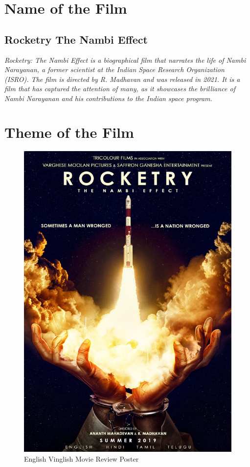 \documentclass[11pt]{article}
\begin{document}
\tableofcontents
\thispagestyle{empty}
\clearpage

\setcounter{page}{1}


\section{Name of the Film}

\subsection*{Rocketry The Nambi Effect}

\textit{
	Rocketry: The Nambi Effect is a biographical film that narrates the life of Nambi Narayanan, a former scientist at the Indian Space Research Organization (ISRO). The film is directed by R. Madhavan and was released in 2021. It is a film that has captured the attention of many, as it showcases the brilliance of Nambi Narayanan and his contributions to the Indian space program.
}


\section{Theme of the Film}


\begin{figure}[H]
	\centering
	\includegraphics[width=.45\textwidth]{rocketry-the-nambi-effect-review_b_3006221242.jpg}
	\caption{English Vinglish Movie Review Poster}
\end{figure}
\end{document}
